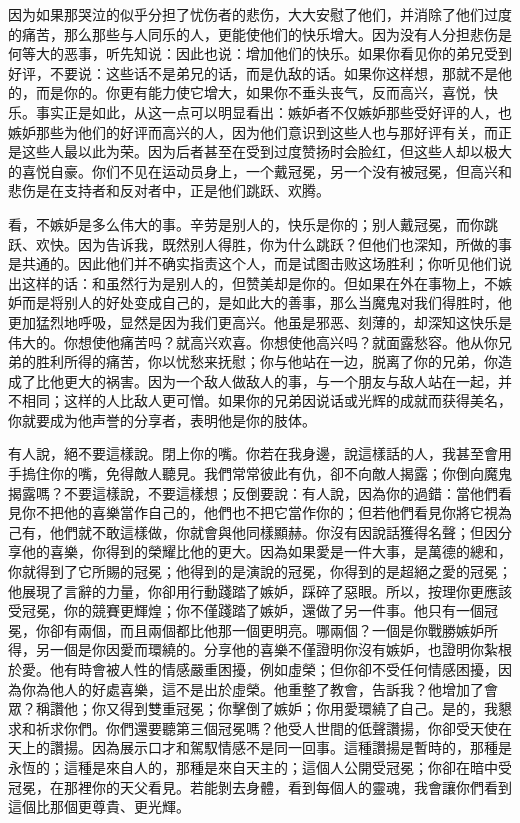 因为如果那哭泣的似乎分担了忧伤者的悲伤，大大安慰了他们，并消除了他们过度的痛苦，那么那些与人同乐的人，更能使他们的快乐增大。因为没有人分担悲伤是何等大的恶事，听先知说：因此也说：增加他们的快乐。如果你看见你的弟兄受到好评，不要说：这些话不是弟兄的话，而是仇敌的话。如果你这样想，那就不是他的，而是你的。你更有能力使它增大，如果你不垂头丧气，反而高兴，喜悦，快乐。事实正是如此，从这一点可以明显看出：嫉妒者不仅嫉妒那些受好评的人，也嫉妒那些为他们的好评而高兴的人，因为他们意识到这些人也与那好评有关，而正是这些人最以此为荣。因为后者甚至在受到过度赞扬时会脸红，但这些人却以极大的喜悦自豪。你们不见在运动员身上，一个戴冠冕，另一个没有被冠冕，但高兴和悲伤是在支持者和反对者中，正是他们跳跃、欢腾。\par

看，不嫉妒是多么伟大的事。辛劳是别人的，快乐是你的；别人戴冠冕，而你跳跃、欢快。因为告诉我，既然别人得胜，你为什么跳跃？但他们也深知，所做的事是共通的。因此他们并不确实指责这个人，而是试图击败这场胜利；你听见他们说出这样的话：和虽然行为是别人的，但赞美却是你的。但如果在外在事物上，不嫉妒而是将别人的好处变成自己的，是如此大的善事，那么当魔鬼对我们得胜时，他更加猛烈地呼吸，显然是因为我们更高兴。他虽是邪恶、刻薄的，却深知这快乐是伟大的。你想使他痛苦吗？就高兴欢喜。你想使他高兴吗？就面露愁容。他从你兄弟的胜利所得的痛苦，你以忧愁来抚慰；你与他站在一边，脱离了你的兄弟，你造成了比他更大的祸害。因为一个敌人做敌人的事，与一个朋友与敌人站在一起，并不相同；这样的人比敌人更可憎。如果你的兄弟因说话或光辉的成就而获得美名，你就要成为他声誉的分享者，表明他是你的肢体。\par

有人說，絕不要這樣說。閉上你的嘴。你若在我身邊，說這樣話的人，我甚至會用手摀住你的嘴，免得敵人聽見。我們常常彼此有仇，卻不向敵人揭露；你倒向魔鬼揭露嗎？不要這樣說，不要這樣想；反倒要說：有人說，因為你的過錯：當他們看見你不把他的喜樂當作自己的，他們也不把它當作你的；但若他們看見你將它視為己有，他們就不敢這樣做，你就會與他同樣顯赫。你沒有因說話獲得名聲；但因分享他的喜樂，你得到的榮耀比他的更大。因為如果愛是一件大事，是萬德的總和，你就得到了它所賜的冠冕；他得到的是演說的冠冕，你得到的是超絕之愛的冠冕；他展現了言辭的力量，你卻用行動踐踏了嫉妒，踩碎了惡眼。所以，按理你更應該受冠冕，你的競賽更輝煌；你不僅踐踏了嫉妒，還做了另一件事。他只有一個冠冕，你卻有兩個，而且兩個都比他那一個更明亮。哪兩個？一個是你戰勝嫉妒所得，另一個是你因愛而環繞的。分享他的喜樂不僅證明你沒有嫉妒，也證明你紮根於愛。他有時會被人性的情感嚴重困擾，例如虛榮；但你卻不受任何情感困擾，因為你為他人的好處喜樂，這不是出於虛榮。他重整了教會，告訴我？他增加了會眾？稱讚他；你又得到雙重冠冕；你擊倒了嫉妒；你用愛環繞了自己。是的，我懇求和祈求你們。你們還要聽第三個冠冕嗎？他受人世間的低聲讚揚，你卻受天使在天上的讚揚。因為展示口才和駕馭情感不是同一回事。這種讚揚是暫時的，那種是永恆的；這種是來自人的，那種是來自天主的；這個人公開受冠冕；你卻在暗中受冠冕，在那裡你的天父看見。若能剝去身體，看到每個人的靈魂，我會讓你們看到這個比那個更尊貴、更光輝。\par

